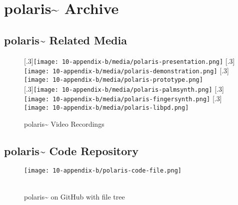 \chapter{polaris\textasciitilde{} Archive}\label{sec: appendix-b}

\section{polaris\textasciitilde{} Related Media}
\begin{figure}[!ht]
    \centering
    [.3\linewidth]{\texttt{[image: 10-appendix-b/media/polaris-presentation.png]}}
    \hfill
    [.3\linewidth]{\texttt{[image: 10-appendix-b/media/polaris-demonstration.png]}}
    \hfill
    [.3\linewidth]{\texttt{[image: 10-appendix-b/media/polaris-prototype.png]}} \\
    \vspace*{1cm}
    [.3\linewidth]{\texttt{[image: 10-appendix-b/media/polaris-palmsynth.png]}}
    \hfill
    [.3\linewidth]{\texttt{[image: 10-appendix-b/media/polaris-fingersynth.png]}}
    \hfill
    [.3\linewidth]{\texttt{[image: 10-appendix-b/media/polaris-libpd.png]}}%
    \caption*{polaris\textasciitilde{} Video Recordings}\label{sec: appendix-b-media}
\end{figure}
\clearpage



\section{polaris\textasciitilde{} Code Repository}
\begin{figure}[!ht]
    \centering
    \texttt{[image: 10-appendix-b/polaris-code-file.png]}
    \caption*{ \\ polaris\textasciitilde{} on GitHub with file tree}\label{sec: appendix-b-code}
\end{figure}
\clearpage



